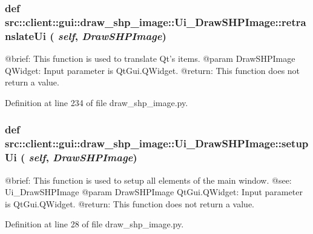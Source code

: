 \hypertarget{classsrc_1_1client_1_1gui_1_1draw__shp__image_1_1Ui__DrawSHPImage_af2b1a4e4aa065580cd1406e2a06ad39e}{
\subsubsection[{retranslateUi}]{\setlength{\rightskip}{0pt plus 5cm}def src::client::gui::draw\_\-shp\_\-image::Ui\_\-DrawSHPImage::retranslateUi ( {\em self}, \/   {\em DrawSHPImage})}}
\label{classsrc_1_1client_1_1gui_1_1draw__shp__image_1_1Ui__DrawSHPImage_af2b1a4e4aa065580cd1406e2a06ad39e}
\begin{DoxyVerb}
@brief: This function is used to translate Qt's items.
@param DrawSHPImage QWidget: Input parameter is QtGui.QWidget.
@return: This function does not return a value.
\end{DoxyVerb}
 

Definition at line 234 of file draw\_\-shp\_\-image.py.

\hypertarget{classsrc_1_1client_1_1gui_1_1draw__shp__image_1_1Ui__DrawSHPImage_aadd063e3e5480615a2f1a23ad1b8b2d8}{
\subsubsection[{setupUi}]{\setlength{\rightskip}{0pt plus 5cm}def src::client::gui::draw\_\-shp\_\-image::Ui\_\-DrawSHPImage::setupUi ( {\em self}, \/   {\em DrawSHPImage})}}
\label{classsrc_1_1client_1_1gui_1_1draw__shp__image_1_1Ui__DrawSHPImage_aadd063e3e5480615a2f1a23ad1b8b2d8}
\begin{DoxyVerb}
@brief: This function is used to setup all elements of the main window.
@see: Ui_DrawSHPImage
@param DrawSHPImage QtGui.QWidget: Input parameter is QtGui.QWidget.
@return: This function does not return a value. 
\end{DoxyVerb}
 

Definition at line 28 of file draw\_\-shp\_\-image.py.



